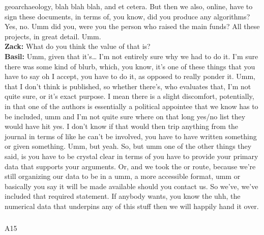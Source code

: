 \documentclass[
  canadian,
]{article}
\makeatletter
\let\oldsubparagraph\subparagraph
\renewcommand{\subparagraph}{
    \@ifstar
      \xxxSubParagraphStar
      \xxxSubParagraphNoStar
  }
\newcommand{\xxxSubParagraphStar}[1]{\oldsubparagraph*{#1}\mbox{}}
\newcommand{\xxxSubParagraphNoStar}[1]{\oldsubparagraph{#1}\mbox{}}
\makeatother
\begin{document}
geoarchaeology, blah blah blah, and et cetera. But then we also, online,
have to sign these documents, in terms of, you know, did you produce any
algorithms? Yes, no. Umm did you, were you the person who raised the
main funds? All these projects, in great detail. Umm.\\
\textbf{Zack:} What do you think the value of that is?\\
\textbf{Basil:} Umm, given that it's\ldots{} I'm not entirely sure why
we had to do it. I'm sure there was some kind of blurb, which, you know,
it's one of these things that you have to say oh I accept, you have to
do it, as opposed to really ponder it. Umm, that I don't think is
published, so whether there's, who evaluates that, I'm not quite sure,
or it's exact purpose. I mean there is a slight discomfort, potentially,
in that one of the authors is essentially a political appointee that we
know has to be included, umm and I'm not quite sure where on that long
yes/no list they would have hit yes. I don't know if that would then
trip anything from the journal in terms of like he can't be involved,
you have to have written something or given something. Umm, but yeah.
So, but umm one of the other things they said, is you have to be crystal
clear in terms of you have to provide your primary data that supports
your arguments. Or, and we took the or route, because we're still
organizing our data to be in a umm, a more accessible format, umm or
basically you say it will be made available should you contact us. So
we've, we've included that required statement. If anybody wants, you
know the uhh, the numerical data that underpins any of this stuff then
we will happily hand it over.

\subparagraph{A15}\label{sec-A15}
\end{document}
